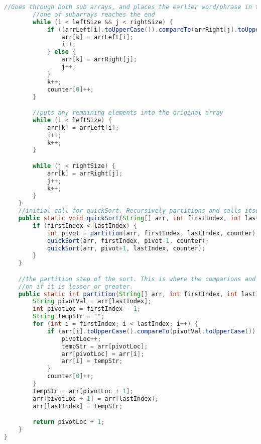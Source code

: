 \documentclass[letterpaper, 10pt,DIV=13]{scrartcl}
\numberwithin{equation}{section} %
\numberwithin{figure}{section} %
\numberwithin{table}{section} %
\begin{document}
\begin{lstlisting}[frame=single, breaklines, language=java]
        //Goes through both sub arrays, and places the earlier word/phrase in the original array at that position, until
        //one of subarrays reaches the end
        while (i < leftSize && j < rightSize) {
            if ((arrLeft[i].toUpperCase()).compareTo(arrRight[j].toUpperCase()) <= 0) {
                arr[k] = arrLeft[i];
                i++;
            } else {
                arr[k] = arrRight[j];
                j++;
            }
            k++;
            counter[0]++;
        }

        //puts any remaining elements into the original array
        while (i < leftSize) {
            arr[k] = arrLeft[i];
            i++;
            k++;
        }

        while (j < rightSize) {
            arr[k] = arrRight[j];
            j++;
            k++;
        }
    }
    //initial call for quickSort. Recursively partitions and calls itself until the list is merged
    public static void quickSort(String[] arr, int firstIndex, int lastIndex, int[] counter) {
        if (firstIndex < lastIndex) {
            int pivot = partition(arr, firstIndex, lastIndex, counter);
            quickSort(arr, firstIndex, pivot-1, counter);
            quickSort(arr, pivot+1, lastIndex, counter);
        }
    }

    //the partition step of the sort. This is where the comparions and sorting occurs. Chooses a pivot and puts other elements on either side of it depending
    //on if it is lesser or greater.
    public static int partition(String[] arr, int firstIndex, int lastIndex, int[] counter) {
        String pivotVal = arr[lastIndex];
        int pivotLoc = firstIndex - 1;
        String tempStr = "";
        for (int i = firstIndex; i < lastIndex; i++) {
            if (arr[i].toUpperCase().compareTo(pivotVal.toUpperCase()) <= 0) {
                pivotLoc++;
                tempStr = arr[pivotLoc];
                arr[pivotLoc] = arr[i];
                arr[i] = tempStr;
            }
            counter[0]++;
        }
        tempStr = arr[pivotLoc + 1];
        arr[pivotLoc + 1] = arr[lastIndex];
        arr[lastIndex] = tempStr;

        return pivotLoc + 1;
    }
}
\end{lstlisting}
\end{document}

